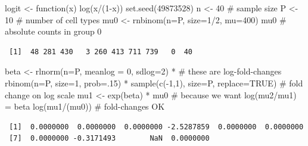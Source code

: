 \documentclass[
  letterpaper,
  DIV=11,
  numbers=noendperiod]{scrartcl}
\newenvironment{Shaded}{\begin{snugshade}}{\end{snugshade}}
\newcommand{\AttributeTok}[1]{\textcolor[rgb]{0.40,0.45,0.13}{#1}}
\newcommand{\CommentTok}[1]{\textcolor[rgb]{0.37,0.37,0.37}{#1}}
\newcommand{\ConstantTok}[1]{\textcolor[rgb]{0.56,0.35,0.01}{#1}}
\newcommand{\ControlFlowTok}[1]{\textcolor[rgb]{0.00,0.23,0.31}{#1}}
\newcommand{\DecValTok}[1]{\textcolor[rgb]{0.68,0.00,0.00}{#1}}
\newcommand{\FunctionTok}[1]{\textcolor[rgb]{0.28,0.35,0.67}{#1}}
\newcommand{\NormalTok}[1]{\textcolor[rgb]{0.00,0.23,0.31}{#1}}
\newcommand{\OtherTok}[1]{\textcolor[rgb]{0.00,0.23,0.31}{#1}}
\newcommand{\SpecialCharTok}[1]{\textcolor[rgb]{0.37,0.37,0.37}{#1}}
\begin{document}
\begin{Shaded}
\begin{Highlighting}[]
\NormalTok{logit }\OtherTok{\textless{}{-}} \ControlFlowTok{function}\NormalTok{(x) }\FunctionTok{log}\NormalTok{(x}\SpecialCharTok{/}\NormalTok{(}\DecValTok{1}\SpecialCharTok{{-}}\NormalTok{x))}
\FunctionTok{set.seed}\NormalTok{(}\DecValTok{49873528}\NormalTok{)}
\NormalTok{n }\OtherTok{\textless{}{-}} \DecValTok{40} \CommentTok{\# sample size}
\NormalTok{P }\OtherTok{\textless{}{-}} \DecValTok{10} \CommentTok{\# number of cell types}
\NormalTok{mu0 }\OtherTok{\textless{}{-}} \FunctionTok{rnbinom}\NormalTok{(}\AttributeTok{n=}\NormalTok{P, }\AttributeTok{size=}\DecValTok{1}\SpecialCharTok{/}\DecValTok{2}\NormalTok{, }\AttributeTok{mu=}\DecValTok{400}\NormalTok{)}
\NormalTok{mu0 }\CommentTok{\# absolute counts in group 0}
\end{Highlighting}
\end{Shaded}

\begin{verbatim}
 [1]  48 281 430   3 260 413 711 739   0  40
\end{verbatim}

\begin{Shaded}
\begin{Highlighting}[]
\NormalTok{beta }\OtherTok{\textless{}{-}} \FunctionTok{rlnorm}\NormalTok{(}\AttributeTok{n=}\NormalTok{P, }\AttributeTok{meanlog =} \DecValTok{0}\NormalTok{, }\AttributeTok{sdlog=}\DecValTok{2}\NormalTok{) }\SpecialCharTok{*} \CommentTok{\# these are log{-}fold{-}changes}
  \FunctionTok{rbinom}\NormalTok{(}\AttributeTok{n=}\NormalTok{P, }\AttributeTok{size=}\DecValTok{1}\NormalTok{, }\AttributeTok{prob=}\NormalTok{.}\DecValTok{15}\NormalTok{) }\SpecialCharTok{*}
  \FunctionTok{sample}\NormalTok{(}\FunctionTok{c}\NormalTok{(}\SpecialCharTok{{-}}\DecValTok{1}\NormalTok{,}\DecValTok{1}\NormalTok{), }\AttributeTok{size=}\NormalTok{P, }\AttributeTok{replace=}\ConstantTok{TRUE}\NormalTok{) }\CommentTok{\# fold change on log scale}
\NormalTok{mu1 }\OtherTok{\textless{}{-}} \FunctionTok{exp}\NormalTok{(beta) }\SpecialCharTok{*}\NormalTok{ mu0 }\CommentTok{\# because we want log(mu2/mu1) = beta}
\FunctionTok{log}\NormalTok{(mu1}\SpecialCharTok{/}\NormalTok{(mu0)) }\CommentTok{\# fold{-}changes OK}
\end{Highlighting}
\end{Shaded}

\begin{verbatim}
 [1]  0.0000000  0.0000000  0.0000000 -2.5287859  0.0000000  0.0000000
 [7]  0.0000000 -0.3171493        NaN  0.0000000
\end{verbatim}
\end{document}
